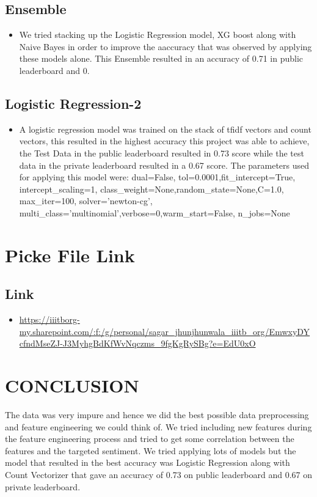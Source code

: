 \documentclass[12pt]{article}
\begin{document}
 \subsection{Ensemble}
 \begin{itemize}
     \item We tried stacking up the Logistic Regression model, XG boost along with Naive Bayes in order to improve the aaccuracy that was observed by applying these models alone. This Ensemble resulted in an accuracy of 0.71 in public leaderboard and 0.
 \end{itemize}
\subsection{Logistic Regression-2}
\begin{itemize}
    \item  A logistic regression model was trained on the stack of tfidf vectors and count vectors, this resulted in the highest accuracy this project was able to achieve, the Test Data in the public leaderboard resulted in 0.73 score while the test data in the private leaderboard resulted in a 0.67 score. The parameters used for applying this model were: dual=False, tol=0.0001,fit\_intercept=True,
    intercept\_scaling=1, 
    class\_weight=None,random\_state=None,C=1.0,
    max\_iter=100,
    solver='newton-cg',
    multi\_class='multinomial',verbose=0,warm\_start=False,
    n\_jobs=None
\end{itemize}

\section{Picke File Link}

\subsection {Link}
\begin{itemize}
    \item \url{https://iiitborg-my.sharepoint.com/:f:/g/personal/sagar_jhunjhunwala_iiitb_org/EmwxyDYcfndMseZJ-J3MyhgBdKfWvNqczms_9fgKgRySBg?e=EdU0xO}
\end{itemize}



\section{CONCLUSION}

The data was very impure and hence we did the best possible data preprocessing and feature engineering we could think of. We tried including new features during the feature engineering process and tried to get some correlation between the features and the targeted sentiment. We tried applying lots of models but the model that resulted in the best accuracy was Logistic Regression along with Count Vectorizer that gave an accuracy of 0.73 on public leaderboard and 0.67 on private leaderboard.
\end{document}
